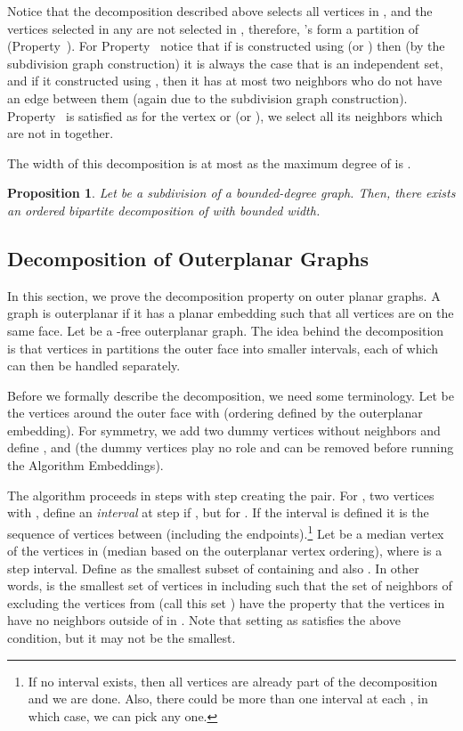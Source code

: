 \documentclass[11pt]{article}
\newtheorem{proposition}[theorem]{Proposition}
\begin{document}
Notice that the decomposition described above selects all vertices in , and the vertices selected in any  are not selected in , therefore, 's form a partition of  (Property~). For Property~ notice that if   is constructed using  (or ) then (by the subdivision graph construction) it is always the case that  is an independent set, and if it constructed using , then it has at most two neighbors who do not have an edge between them (again due to the subdivision graph construction). Property~ is satisfied as for the vertex  or  (or ), we select all its neighbors which are not in  together. 

The width of this decomposition is at most   as  the maximum degree of  is . 

\begin{proposition} \label{prop:2}
Let  be a subdivision of a bounded-degree graph. Then,  there exists an ordered bipartite decomposition of  with bounded width.
\end{proposition}

\subsection{Decomposition of Outerplanar Graphs}
In this section, we prove the decomposition property on outer planar graphs.
A graph is outerplanar if it has a planar embedding such that all vertices are on the same face. Let  be a -free outerplanar graph. The idea behind the decomposition is that vertices in  partitions the outer face into smaller intervals, each of which can then be handled separately. 

Before we formally describe the decomposition, we need some terminology. Let  be the vertices around the outer face with  (ordering defined by the outerplanar embedding). For symmetry, we add two dummy vertices  without neighbors and define , and  (the dummy vertices play no role and can be removed before running the Algorithm Embeddings).  

The algorithm proceeds in steps with step  creating the  pair. For , two vertices  with , define an {\em interval} at step  if , but for . If the interval is defined it is the sequence of vertices between  (including the endpoints).\!\footnote{If no interval exists, then all vertices are already part of the decomposition and we are done. Also, there could be more than one interval at each , in which case, we can pick any one.}  Let  be a median vertex of the vertices in  (median based on the outerplanar vertex ordering), where  is a step  interval.  Define  as the smallest subset of  containing  and also . In other words,  is the smallest set of vertices in  including  such that the set of neighbors of  excluding the vertices from  (call this set ) have the property that the vertices in  have no neighbors outside of  in . Note that setting  as  satisfies the above condition, but it may not be the smallest. 
\end{document}
